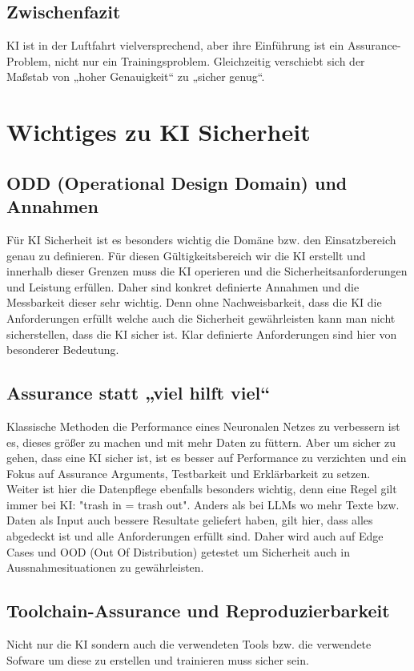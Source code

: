 \section{Zwischenfazit}
KI ist in der Luftfahrt vielversprechend, aber ihre Einführung ist ein Assurance-Problem, nicht nur ein Trainingsproblem. 
Gleichzeitig verschiebt sich der Maßstab von „hoher Genauigkeit“ zu „sicher genug“.







\chapter{Wichtiges zu KI Sicherheit}
\section{ODD (Operational Design Domain) und Annahmen}
Für KI Sicherheit ist es besonders wichtig die Domäne bzw. den Einsatzbereich genau zu definieren. 
Für diesen Gültigkeitsbereich wir die KI erstellt und innerhalb dieser Grenzen muss die KI operieren 
und die Sicherheitsanforderungen und Leistung erfüllen. Daher sind konkret definierte Annahmen und 
die Messbarkeit dieser sehr wichtig. Denn ohne Nachweisbarkeit, dass die KI die Anforderungen erfüllt 
welche auch die Sicherheit gewährleisten kann man nicht sicherstellen, dass die KI sicher ist. 
Klar definierte Anforderungen sind hier von besonderer Bedeutung.
\section{Assurance statt „viel hilft viel“}
Klassische Methoden die Performance eines Neuronalen Netzes zu verbessern ist es, dieses größer zu machen 
und mit mehr Daten zu füttern. Aber um sicher zu gehen, dass eine KI sicher ist, ist es besser auf 
Performance zu verzichten und ein Fokus auf Assurance Arguments, Testbarkeit und Erklärbarkeit zu setzen.\\
Weiter ist hier die Datenpflege ebenfalls besonders wichtig, denn eine Regel gilt immer bei KI: "trash in = trash out".
Anders als bei LLMs wo mehr Texte bzw. Daten als Input auch bessere Resultate geliefert haben, gilt 
hier, dass alles abgedeckt ist und alle Anforderungen erfüllt sind. Daher wird auch auf Edge Cases 
und OOD (Out Of Distribution) getestet um Sicherheit auch in Aussnahmesituationen zu gewährleisten.
\section{Toolchain-Assurance und Reproduzierbarkeit}
Nicht nur die KI sondern auch die verwendeten Tools bzw. die verwendete Sofware um diese zu erstellen 
und trainieren muss sicher sein.
